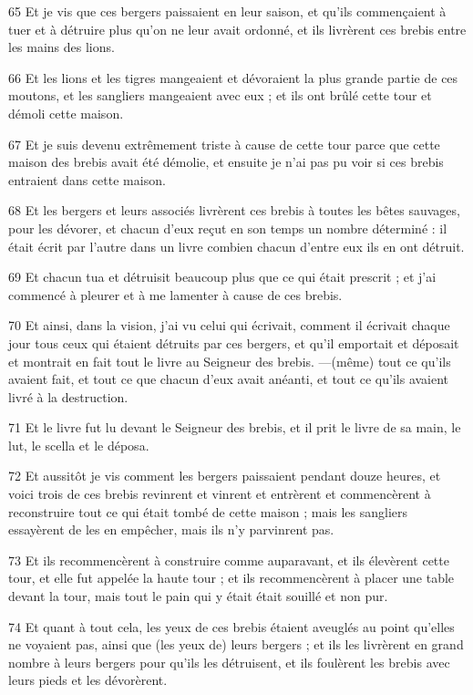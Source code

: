 \par 65 Et je vis que ces bergers paissaient en leur saison, et qu'ils commençaient à tuer et à détruire plus qu'on ne leur avait ordonné, et ils livrèrent ces brebis entre les mains des lions.
\par 66 Et les lions et les tigres mangeaient et dévoraient la plus grande partie de ces moutons, et les sangliers mangeaient avec eux ; et ils ont brûlé cette tour et démoli cette maison.
\par 67 Et je suis devenu extrêmement triste à cause de cette tour parce que cette maison des brebis avait été démolie, et ensuite je n'ai pas pu voir si ces brebis entraient dans cette maison.
\par 68 Et les bergers et leurs associés livrèrent ces brebis à toutes les bêtes sauvages, pour les dévorer, et chacun d'eux reçut en son temps un nombre déterminé : il était écrit par l'autre dans un livre combien chacun d'entre eux ils en ont détruit.
\par 69 Et chacun tua et détruisit beaucoup plus que ce qui était prescrit ; et j'ai commencé à pleurer et à me lamenter à cause de ces brebis.
\par 70 Et ainsi, dans la vision, j'ai vu celui qui écrivait, comment il écrivait chaque jour tous ceux qui étaient détruits par ces bergers, et qu'il emportait et déposait et montrait en fait tout le livre au Seigneur des brebis. —(même) tout ce qu'ils avaient fait, et tout ce que chacun d'eux avait anéanti, et tout ce qu'ils avaient livré à la destruction.
\par 71 Et le livre fut lu devant le Seigneur des brebis, et il prit le livre de sa main, le lut, le scella et le déposa.
\par 72 Et aussitôt je vis comment les bergers paissaient pendant douze heures, et voici trois de ces brebis revinrent et vinrent et entrèrent et commencèrent à reconstruire tout ce qui était tombé de cette maison ; mais les sangliers essayèrent de les en empêcher, mais ils n'y parvinrent pas.
\par 73 Et ils recommencèrent à construire comme auparavant, et ils élevèrent cette tour, et elle fut appelée la haute tour ; et ils recommencèrent à placer une table devant la tour, mais tout le pain qui y était était souillé et non pur.
\par 74 Et quant à tout cela, les yeux de ces brebis étaient aveuglés au point qu'elles ne voyaient pas, ainsi que (les yeux de) leurs bergers ; et ils les livrèrent en grand nombre à leurs bergers pour qu'ils les détruisent, et ils foulèrent les brebis avec leurs pieds et les dévorèrent.
